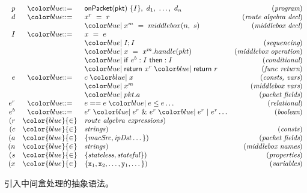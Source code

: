 \begin{figure}[ht]
{%
\[%
\begin{array}{rclr}
p &\bnfdef & \ONPKT\ \{I\},\ d_1,\ \ldots,\ d_n &(\textit{program})\\
d &\bnfdef & x^r\ =\ r\  & (\textit{route algebra decl})\\
 & & \bnfalt x^m\ =\ middlebox(n,\ s) & (\textit{middlebox decl})\\
I &\bnfdef & x\ =\ e & \\
 & & \bnfalt I;I &  (\textit{sequencing})\\
 & & \bnfalt x\ =\ x^m.handle(pkt) &  (\textit{middlebox operation})\\
 & & \bnfalt \ifelse{e^b}{I}{I} &  (\textit{conditional})\\ %
 & & \bnfalt \return{x^r} \bnfalt \return{r} &  (\textit{func return})\\ 
e &\bnfdef & c \bnfalt x &  (\textit{consts, vars})\\
& & \bnfalt x^m & (\textit{middlebox vars}) \\
& & \bnfalt pkt.a & (\textit{packet fields}) \\
e^r & \bnfdef & e == e \bnfalt e \leq e \dots & (\textit{relational})\\
e^b & \bnfdef & e^r \bnfalt e^r\ \&\ e^r \bnfalt e^r\ |\ e^r \dots & (\textit{boolean})\\
(r &{\color{blue}{\in}}&\mathit{route\ algebra\ expressions}) & \\
(c &{\color{blue}{\in}}& \mathit{strings}) & (\mathit{consts})\\
(a &{\color{blue}{\in}}& \{ \mathit{macSrc}, \mathit{ipDst} \dots \}) & (\textit{packet fields})\\
(n &{\color{blue}{\in}}& \mathit{strings})  &  (\textit{middlebox names})\\
(s &{\color{blue}{\in}}& \{ \mathit{stateless},\mathit{stateful} \})  &  (\textit{properties})\\
(x &{\color{blue}{\in}} & \{\tx_1,\tx_2,\dots,\ty_1,\dots\}) &  (\textit{variables})\\
\end{array}\]}%
\caption{引入中间盒处理的抽象语法。}
\label{fig:grammar2}
\end{figure}

